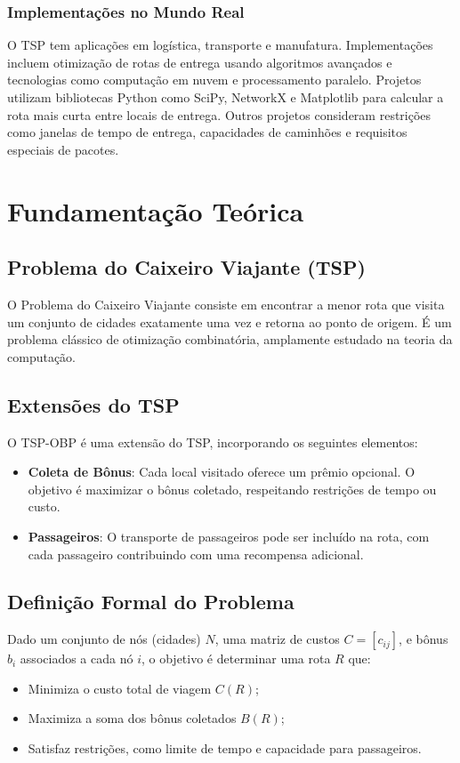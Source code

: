 \documentclass[12pt, a4paper]{report}
\begin{document}
\subsection*{Implementações no Mundo Real}
O TSP tem aplicações em logística, transporte e manufatura. Implementações incluem otimização de rotas de entrega usando algoritmos avançados e tecnologias como computação em nuvem e processamento paralelo. Projetos utilizam bibliotecas Python como SciPy, NetworkX e Matplotlib para calcular a rota mais curta entre locais de entrega. Outros projetos consideram restrições como janelas de tempo de entrega, capacidades de caminhões e requisitos especiais de pacotes.

\chapter{Fundamentação Teórica}

\section{Problema do Caixeiro Viajante (TSP)}
O Problema do Caixeiro Viajante consiste em encontrar a menor rota que visita um conjunto de cidades exatamente uma vez e retorna ao ponto de origem. É um problema clássico de otimização combinatória, amplamente estudado na teoria da computação.

\section{Extensões do TSP}
O TSP-OBP é uma extensão do TSP, incorporando os seguintes elementos:
\begin{itemize}
    \item \textbf{Coleta de Bônus}: Cada local visitado oferece um prêmio opcional. O objetivo é maximizar o bônus coletado, respeitando restrições de tempo ou custo.
    \item \textbf{Passageiros}: O transporte de passageiros pode ser incluído na rota, com cada passageiro contribuindo com uma recompensa adicional.
\end{itemize}

\section{Definição Formal do Problema}
Dado um conjunto de nós (cidades) $N$, uma matriz de custos $C = [c_{ij}]$, e bônus $b_i$ associados a cada nó $i$, o objetivo é determinar uma rota $R$ que:
\begin{itemize}
    \item Minimiza o custo total de viagem $C(R)$;
    \item Maximiza a soma dos bônus coletados $B(R)$;
    \item Satisfaz restrições, como limite de tempo e capacidade para passageiros.
\end{itemize}
\end{document}
